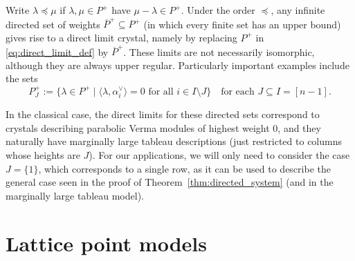 \documentclass[11pt]{article}
\begin{document}
\begin{remark}
\label{rem:sub_direct_limits}
Write  $\lambda \preceq \mu$ if $\lambda,\mu \in P^+$ have $\mu - \lambda \in P^+$.
Under the order $\preceq$, any infinite directed set of weights $\overline{P}^+ \subseteq P^+$ (in which every finite set has an upper bound)   gives rise to a direct limit crystal, namely by replacing $P^+$ in \eqref{eq:direct_limit_def} by $\overline{P}^+$.
These limits are not necessarily isomorphic,
although they are always upper regular.
Particularly important examples include the sets
\begin{equation}
\label{eq:parabolic_directed_weights}
P_J^+ := \{\lambda \in P^+ \mid \langle \lambda, \alpha_i^{\vee} \rangle = 0 \text{ for all } i \in I \setminus J \}
\quad\text{for each $J \subseteq I = [n-1]$.}
\end{equation}
\end{remark}

In the classical case, the direct limits for these directed sets correspond to crystals describing parabolic Verma modules of highest weight $0$, and they naturally have marginally large tableau descriptions  (just restricted to columns whose heights are $J$).
For our applications, we will only need to consider the case $J = \{1\}$, which corresponds to a single row,  as it can be used to describe the general case seen in the proof of Theorem~\ref{thm:directed_system} (and in the marginally large tableau model).










\section{Lattice point models}
\label{sec:parameterizations}
\end{document}
